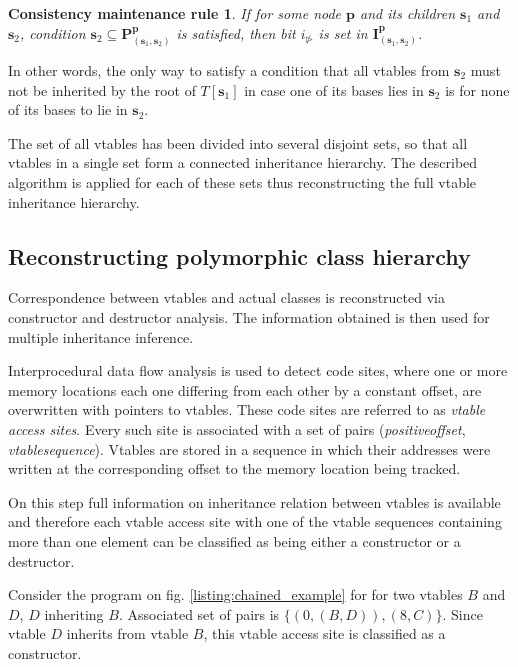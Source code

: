 \documentclass[10pt, conference]{IEEEtran}
\newcommand{\ib}[1]{\textbf{#1}}
\newcommand{\gI}{\ib{I}}
\newcommand{\gP}{\ib{P}}
\newcommand{\gp}{\ib{p}}
\newcommand{\gs}{\ib{s}}
\newcommand{\inrhd}{i_{\nrhd}}
\newcommand{\offset}{\textit{offset}}
\newcommand{\vtable}{\textit{vtable}}
\newcommand{\positive}{\textit{positive}}
\newcommand{\sequence}{\textit{sequence}}
\newcommand{\nrhd}{\ntriangleright}
\newtheorem{cmr}{Consistency maintenance rule}
\begin{document}
\begin{cmr}
If for some node {\em $\gp$} and its children {\em $\gs_1$} and {\em $\gs_2$},
condition {\em $\gs_2 \subseteq \gP^{\gp}_{(\gs_1, \gs_2)}$} is satisfied, then
bit $\inrhd$ is set in {\em $\gI^{\gp}_{(\gs_1, \gs_2)}$}.
\end{cmr}
In other words, the only way to satisfy a condition that
all vtables from $\gs_2$ must not be inherited by the root of
$T[\gs_1]$ in case one of its bases lies in $\gs_2$ is
for none of its bases to lie in $\gs_2$.

The set of all vtables
has been divided into several disjoint sets, so that all vtables in a single set
form a connected inheritance hierarchy.
The described algorithm is applied for each of these sets
thus
reconstructing the full vtable inheritance hierarchy.



\quad

\subsection{Reconstructing polymorphic class hierarchy}\label{chapterMultiple}
Correspondence between vtables and actual classes is reconstructed
via constructor and destructor analysis. The information obtained is then used for
multiple inheritance inference.

Interprocedural data flow analysis is used to detect
code sites, where one or more memory locations each one differing
from each other by a constant offset, are overwritten with
pointers to vtables.
These code sites are referred to as \textit{vtable access sites}.
Every such site is associated with
a set of pairs (\positive\:\offset, \vtable\:\sequence).
Vtables are stored in a sequence in which their addresses
were written at the corresponding offset to the memory location
being tracked.

On this step full information on inheritance relation
between vtables is available and therefore
each vtable access site with one of the vtable sequences containing
more than one element can be classified as being either
a constructor or a destructor. 

Consider the program on fig. \ref{listing:chained_example} for
for two vtables $B$ and $D$, $D$ inheriting $B$.
Associated set of pairs is $\{(0, (B, D)), (8, C)\}$.
Since vtable $D$ inherits from vtable $B$, this vtable access site is 
classified as a constructor.
\end{document}
